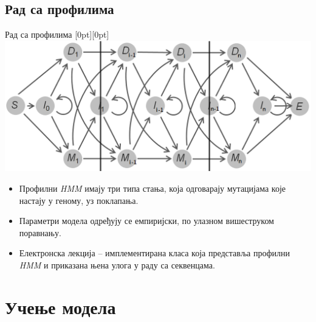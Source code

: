 \documentclass[hyperref={bookmarks=false}]{beamer}
\newcommand{\lenitem}[2][.43\linewidth]{\parbox[t]{#1}{\strut #2\strut}}
\begin{document}
\subsection{Рад са профилима}
\begin{frame}{Рад са профилима}
\mbox{}\hfill\raisebox{-\height}[0pt][0pt]{\includegraphics[width=.5\linewidth]{prof_hmm.png}}
\vspace*{-\baselineskip}

\begin{itemize}
\item \lenitem{Профилни \textit{HMM} имају три типа стања, која одговарају мутацијама које настају у геному, уз поклапања.}
\item \lenitem{Параметри модела одређују се емпиријски, по улазном вишеструком поравнању.}
\item Електронска лекција -- имплементирана класа која представља профилни \textit{HMM} и приказана њена улога у раду са секвенцама.
\end{itemize}
\end{frame}

\section{Учење модела}
\end{document}

